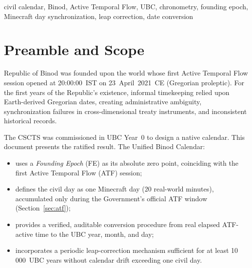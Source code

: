\documentclass[journal,twoside]{IEEEtran}
\begin{document}
\begin{IEEEkeywords}
civil calendar, Binod, Active Temporal Flow, UBC, chronometry, founding epoch,
Minecraft day synchronization, leap correction, date conversion
\end{IEEEkeywords}

\begin{center}
\end{center}

\section{Preamble and Scope}

 Republic of Binod was founded upon the world whose first Active Temporal
Flow session opened at 20:00:00~IST on 23~April~2021~CE (Gregorian proleptic).  For the first years
of the Republic's existence, informal timekeeping relied upon Earth-derived Gregorian dates,
creating administrative ambiguity, synchronization failures in cross-dimensional treaty
instruments, and inconsistent historical records.

The CSCTS was commissioned in UBC Year~0 to design a native calendar.  This document
presents the ratified result.  The Unified Binod Calendar:

\begin{itemize}
  \item uses a \emph{Founding Epoch} (FE) as its absolute zero point, coinciding with the
        first Active Temporal Flow (ATF) session;
  \item defines the civil day as one Minecraft day (20 real-world minutes), accumulated
        only during the Government's official ATF window (Section~\ref{sec:atf});
  \item provides a verified, auditable conversion procedure from real elapsed ATF-active
        time to the UBC year, month, and day;
  \item incorporates a periodic leap-correction mechanism sufficient for at least
        10\,000~UBC years without calendar drift exceeding one civil day.
\end{itemize}
\end{document}
